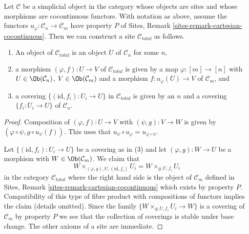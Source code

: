 \begin{lemma}
\label{lemma-simplicial-cocontinuous-site}
Let $\mathcal{C}$ be a simplicial object in the category whose objects are
sites and whose morphisms are cocontinuous functors. With notation as above,
assume the functors $u_\varphi : \mathcal{C}_n \to \mathcal{C}_m$
have property $P$ of Sites, Remark \ref{sites-remark-cartesian-cocontinuous}.
Then we can construct a site $\mathcal{C}_{total}$ as follows.
\begin{enumerate}
\item An object of $\mathcal{C}_{total}$ is an object $U$ of
$\mathcal{C}_n$ for some $n$,
\item a morphism $(\varphi, f) : U \to V$ of $\mathcal{C}_{total}$
is given by a map $\varphi : [m] \to [n]$ with
$U \in \Ob(\mathcal{C}_n)$, $V \in \Ob(\mathcal{C}_m)$
and a morphism $f : u_\varphi(U) \to V$ of $\mathcal{C}_m$, and
\item a covering $\{(\text{id}, f_i) :  U_i \to U\}$ in $\mathcal{C}_{total}$
is given by an $n$ and a covering $\{f_i : U_i \to U\}$
of $\mathcal{C}_n$.
\end{enumerate}
\end{lemma}

\begin{proof}
Composition of $(\varphi, f) : U \to V$ with $(\psi, g) : V \to W$
is given by $(\varphi \circ \psi, g \circ u_\psi(f))$.
This uses that $u_\psi \circ u_\varphi = u_{\varphi \circ \psi}$.

\medskip\noindent
Let $\{(\text{id}, f_i) :  U_i \to U\}$ be a covering as in (3)
and let $(\varphi, g) : W \to U$ be a morphism with
$W \in \Ob(\mathcal{C}_m)$. We claim that
$$
W \times_{(\varphi, g), U, (\text{id}, f_i)} U_i =
W \times_{g, U, f_i} U_i
$$
in the category $\mathcal{C}_{total}$ where the right hand side
is the object of $\mathcal{C}_m$ defined in
Sites, Remark \ref{sites-remark-cartesian-cocontinuous}
which exists by property $P$. Compatibility of this type of fibre product
with compositions of functors implies the claim (details omitted).
Since the family $\{W \times_{g, U, f_i} U_i \to W\}$ is a
covering of $\mathcal{C}_m$ by property $P$ we see that
the collection of coverings is stable under base
change. The other axioms of a site are immediate.
\end{proof}

